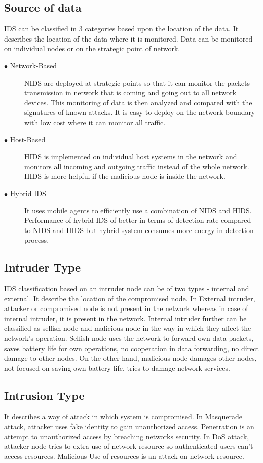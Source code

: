 \subsection{Source of data}
IDS can be classified in 3 categories based upon the location of the data. It describes the location of the data where it is monitored. Data can be monitored on individual nodes or on the strategic point of network.
\begin{description}
    \item[$\bullet$ Network-Based] NIDS are deployed at strategic points so that it can monitor the packets transmission in network that is coming and going out to all network devices. This monitoring of data is then analyzed and compared with the signatures of known attacks. It is easy to deploy on the network boundary  with low cost where it can monitor all traffic.
    \item[$\bullet$ Host-Based] HIDS is implemented on individual host systems in the network and monitors all incoming and outgoing traffic instead of the whole network. HIDS is more helpful if the malicious node is inside the network.
    \item[$\bullet$ Hybrid IDS] It uses mobile agents to efficiently use a combination of NIDS and HIDS. Performance of hybrid IDS of better in terms of detection rate compared to NIDS and HIDS but hybrid system consumes more energy in detection process.
\end{description}
\subsection{Intruder Type}
IDS classification based on  an intruder node can be of two types - internal and external. It describe the location of the compromised node. In External intruder, attacker or compromised node is not present in the network whereas in case of internal intruder, it is present in the network. Internal intruder further can be classified as selfish node and malicious node in the way in which they affect the network's operation. Selfish node uses the network to forward own data packets, saves battery life for own operations, no cooperation in data forwarding, no direct damage to other nodes. On the other hand, malicious node damages other nodes, not focused on saving own battery life, tries to damage network services.
\subsection{Intrusion Type}
It describes a way of attack in which system is compromised. In Masquerade attack, attacker uses fake identity to gain unauthorized access. Penetration is an attempt to unauthorized access by breaching networks security. In DoS attack, attacker node tries to extra use of network resource so authenticated users can’t access resources. Malicious Use of resources is an attack on network resource.

